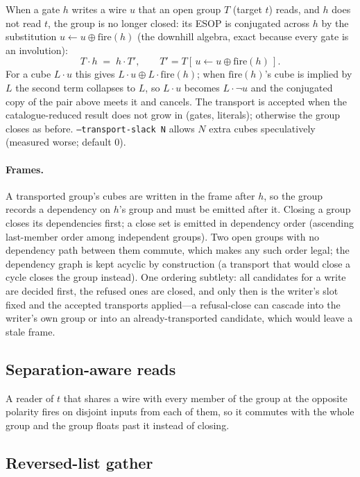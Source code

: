 \documentclass[11pt]{article}
\begin{document}
When a gate $h$ writes a wire $u$ that an open group $T$ (target $t$) reads, and $h$ does not
read $t$, the group is no longer closed: its ESOP is conjugated across $h$ by the substitution
$u \leftarrow u \oplus \mathrm{fire}(h)$ (the downhill algebra, exact because every gate is an
involution):
\[ T\cdot h \;=\; h\cdot T', \qquad T' = T[\,u \leftarrow u \oplus \mathrm{fire}(h)\,]. \]
For a cube $L\cdot u$ this gives $L\cdot u \oplus L\cdot\mathrm{fire}(h)$; when $\mathrm{fire}(h)$'s
cube is implied by $L$ the second term collapses to $L$, so $L\cdot u$ becomes $L\cdot\lnot u$ and
the conjugated copy of the pair above meets it and cancels. The transport is accepted when the
catalogue-reduced result does not grow in (gates, literals); otherwise the group closes as
before. \texttt{--transport-slack N} allows $N$ extra cubes speculatively (measured worse;
default 0).

\paragraph{Frames.} A transported group's cubes are written in the frame after $h$, so the
group records a dependency on $h$'s group and must be emitted after it. Closing a group closes
its dependencies first; a close set is emitted in dependency order (ascending last-member
order among independent groups). Two open groups with no dependency path between them
commute, which makes any such order legal; the dependency graph is kept acyclic by
construction (a transport that would close a cycle closes the group instead). One ordering
subtlety: all candidates for a write are decided first, the refused ones are closed, and only
then is the writer's slot fixed and the accepted transports applied---a refusal-close can
cascade into the writer's own group or into an already-transported candidate, which would
leave a stale frame.

\subsection{Separation-aware reads}

A reader of $t$ that shares a wire with every member of the group at the opposite polarity
fires on disjoint inputs from each of them, so it commutes with the whole group and the group
floats past it instead of closing.

\subsection{Reversed-list gather}
\end{document}
